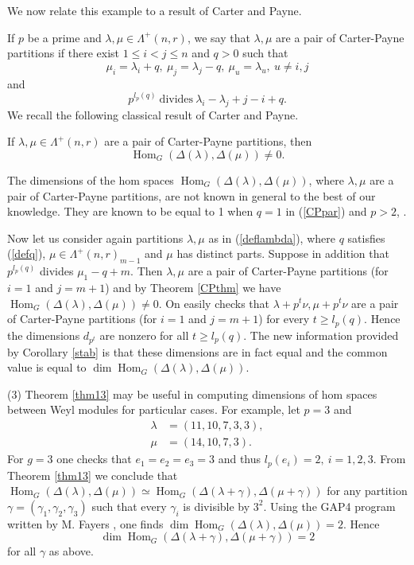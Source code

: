 \documentclass[ALCO,Unicode]{cedram}
\newcommand{\la}{\lambda}
\newcommand{\La}{\Lambda}
\DeclareMathOperator{\Hom}{Hom}
\numberwithin{equation}{section}
\begin{document}
\begin{exams}
	We now relate this example to a result of Carter and Payne.
	
	If $p$ be a prime and $\lambda, \mu \in \La^+(n,r)$, we say that $\lambda, \mu$ are a pair of Carter-Payne partitions if there exist $1 \le i<j \le n$ and $q>0$ such that \begin{equation}\label{CPpar}\mu_i=\lambda_i +q, \ \mu_j=\lambda_j -q, \ \mu_u=\lambda_u, \ u \neq i,j \end{equation}
	and \begin{equation}\label{CPdiv} p^{l_p(q)} \ \textrm{divides} \ \lambda_i-\lambda_j +j-i+q.
	\end{equation}
	We recall the following classical result of Carter and Payne.
	\begin{theo}[{\cite{CP}}]\label{CPthm}
If $\lambda, \mu \in \La^+(n,r)$ are a pair of Carter-Payne partitions, then \[\Hom_G(\Delta(\lambda), \Delta(\mu)) \neq 0.\]
	\end{theo}
	The dimensions of the hom spaces $\Hom_G(\Delta(\lambda), \Delta(\mu))$, where $\lambda, \mu$ are a pair of Carter-Payne partitions, are not known in general to the best of our knowledge. They are known to be equal to 1 when $q=1$ in (\ref{CPpar}) and $p>2$, \cite{EM}.
	
	Now let us consider again partitions $\lambda,  \mu $ as  in (\ref{deflambda}), where $q$ satisfies (\ref{defq}), $\mu \in \La^+(n,r)_{m-1}$ and $\mu$ has distinct parts. Suppose in addition that $p^{l_p(q)}$ divides $\mu_1-q+m$. Then $\lambda, \mu$ are a pair of Carter-Payne partitions (for $i=1$ and $j=m+1$) and by Theorem \ref{CPthm} we have $\Hom_G(\Delta(\lambda), \Delta(\mu)) \neq 0$. On easily checks that $\lambda +p^t\nu, \mu +p^t\nu$ are a pair of Carter-Payne partitions (for $i=1$ and $j=m+1$) for every $t \ge l_p(q)$. Hence the dimensions $d_{p^t}$ are nonzero for all $ t \ge l_p(q)$. The new information provided by Corollary \ref{stab} is that these dimensions are in fact equal and the common value is equal to $\dim \Hom_G(\Delta(\la),\Delta(\mu)).$
	
	(3) Theorem \ref{thm13} may be useful in computing dimensions of hom spaces between Weyl modules for particular cases. For example, let $p=3$ and \begin{align*}\lambda&=(11, 10, 7, 3, 3), \\ \mu &=(14, 10, 7, 3). \end{align*} For $g=3$ one checks that  $e_1=e_2=e_3=3$ and thus $l_p(e_i)=2, \ i=1,2,3$. From Theorem \ref{thm13} we conclude that $\Hom_G(\Delta(\la),\Delta(\mu)) \simeq \Hom_{G}(\Delta(\la+\gamma), \Delta(\mu+\gamma))$ for any partition $\gamma = (\gamma_1, \gamma_2, \gamma_3)$ such that every $\gamma_i$ is divisible by $3^2$. Using the GAP4 program written by M. Fayers \cite{FGAP}, one finds $\dim\Hom_G(\Delta(\lambda), \Delta(\mu))=2.$ Hence \[\dim\Hom_G(\Delta(\lambda +\gamma), \Delta(\mu + \gamma))=2\] for all  $\gamma$ as above.


\end{exams}
\end{document}

